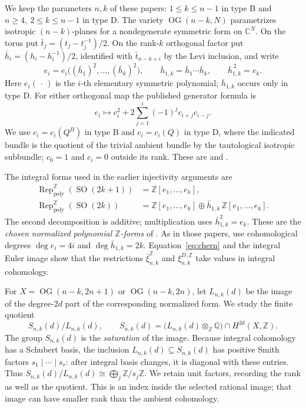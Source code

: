 \documentclass[11pt,letterpaper]{article}
\newcommand{\Z}{\mathbb Z}
\newcommand{\Q}{\mathbb Q}
\newcommand{\C}{\mathbb C}
\newcommand{\Rep}{\operatorname{Rep}}
\newcommand{\SO}{\operatorname{SO}}
\newcommand{\OG}{\operatorname{OG}}
\newcommand{\poly}{\mathrm{poly}}
\newcommand{\hbarprod}{\bar h_{1,k}}
\begin{document}
We keep the parameters \(n,k\) of these papers:
\(1\le k\le n-1\) in type B and \(n\ge4,\ 2\le k\le n-1\) in type D.
The variety \(\OG(n-k,N)\) parametrizes isotropic \((n-k)\)-planes
for a nondegenerate symmetric form on \(\C^N\).
On the torus put \(\bar t_j=(t_j-t_j^{-1})/2\).
On the rank-\(k\) orthogonal factor put \(\bar h_i=(h_i-h_i^{-1})/2\), identified
with \(\bar t_{n-k+i}\) by the Levi inclusion, and write
\[
 e_i=e_i\bigl((\bar h_1)^2,\ldots,(\bar h_k)^2\bigr),
 \qquad \hbarprod=\bar h_1\cdots\bar h_k,\qquad \hbarprod^{\,2}=e_k.
\]
Here \(e_i(\,\cdot\,)\) is the \(i\)-th elementary symmetric polynomial;
\(\hbarprod\) occurs only in type D. For either orthogonal map the published
generator formula is
\begin{equation}\label{eq:chern}
 e_i\longmapsto c_i^2+2\sum_{j=1}^{i}(-1)^j c_{i+j}c_{i-j}.
\end{equation}
We use \(c_i=c_i(Q^B)\) in type B and \(c_i=c_i(Q)\) in type D,
where the indicated bundle is the quotient of the trivial ambient bundle
by the tautological isotropic subbundle; \(c_0=1\) and \(c_i=0\) outside
its rank. These are \cite[Proposition 24]{KR} and \cite[Theorem 3.6]{KX}.

\newpage
The integral forms used in the earlier injectivity arguments are
\begin{align*}
 \Rep^\Z_{\poly}(\SO(2k+1))&=\Z[e_1,\ldots,e_k],\\
 \Rep^\Z_{\poly}(\SO(2k))&=\Z[e_1,\ldots,e_k]
                    \oplus\hbarprod\,\Z[e_1,\ldots,e_k].
\end{align*}
The second decomposition is additive; multiplication uses
\(\hbarprod^2=e_k\). These are the \emph{chosen normalized polynomial
\(\Z\)-forms} of \cite{KR,KX}. As in those papers, use cohomological
degrees \(\deg e_i=4i\) and \(\deg\hbarprod=2k\).
Equation~\eqref{eq:chern} and the integral Euler image show that the restrictions
\(\bar\xi^\Z_{n,k}\) and \(\xi^{D,\Z}_{n,k}\) take values in integral cohomology.

For \(X=\OG(n-k,2n+1)\) or \(\OG(n-k,2n)\), let \(L_{n,k}(d)\)
be the image of the degree-\(2d\) part of the corresponding normalized form.
We study the finite quotient
\begin{equation}\label{eq:saturation}
 S_{n,k}(d)/L_{n,k}(d),\qquad
 S_{n,k}(d)=
 \bigl(L_{n,k}(d)\otimes_\Z\Q\bigr)\cap H^{2d}(X,\Z).
\end{equation}
The group \(S_{n,k}(d)\) is the \emph{saturation} of the image.
Because integral cohomology has a Schubert basis, the inclusion
\(L_{n,k}(d)\subseteq S_{n,k}(d)\) has positive Smith factors
\(s_1\mid\cdots\mid s_r\): after integral basis changes, it is diagonal
with these entries. Thus
\(S_{n,k}(d)/L_{n,k}(d)\cong\bigoplus_j\Z/s_j\Z\).
We retain unit factors, recording the rank as well as the quotient.
This is an index inside the selected rational image; that image can
have smaller rank than the ambient cohomology.
\end{document}
